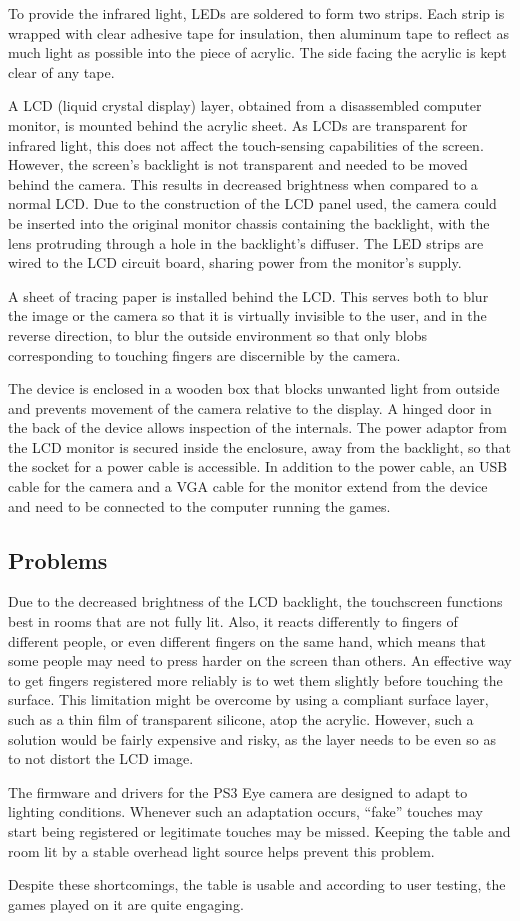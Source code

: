 \documentclass[a4paper,11pt]{article}
\begin{document}
To provide the infrared light, LEDs are soldered to form two strips.
Each strip is wrapped with clear adhesive tape for insulation, then aluminum
tape to reflect as much light as possible into the piece of acrylic.
The side facing the acrylic is kept clear of any tape.

A LCD (liquid crystal display) layer, obtained from a disassembled computer
monitor, is mounted behind the acrylic sheet.
As LCDs are transparent for infrared light, this does not affect the
touch-sensing capabilities of the screen.
However, the screen's backlight is not transparent and needed to be moved
behind the camera.
This results in decreased brightness when compared to a normal LCD.
Due to the construction of the LCD panel used, the camera could be inserted
into the original monitor chassis containing the backlight, with the lens
protruding through a hole in the backlight's diffuser.
The LED strips are wired to the LCD circuit board, sharing power from the
monitor's supply.

A sheet of tracing paper is installed %
behind the LCD. This serves both to blur the image or the camera so that it is
virtually invisible to the user, and in the reverse direction, to blur the
outside environment so that only blobs corresponding to touching fingers
are discernible by the camera.

The device is enclosed in a wooden box that blocks unwanted light from outside
and prevents movement of the camera relative to the display.
A hinged door in the back of the device allows inspection of the internals.
The power adaptor from the LCD monitor is secured inside the enclosure, away
from the backlight, so that the socket for a power cable is accessible.
In addition to the power cable, an USB cable for the camera and a VGA cable
for the monitor extend from the device and need to be connected to the computer
running the games.

\subsection{Problems}

Due to the decreased brightness of the LCD backlight, the touchscreen functions
best in rooms that are not fully lit.
Also, it reacts differently to fingers of different people, or even different
fingers on the same hand, which means that some people may need to press harder
on the screen than others.
An effective way to get fingers registered more reliably is to wet them
slightly before touching the surface.
This limitation might be overcome by using a compliant surface layer, such as
a thin film of transparent silicone, atop the acrylic.
However, such a solution would be fairly expensive and risky, as the layer
needs to be even so as to not distort the LCD image.

The firmware and drivers for the PS3 Eye camera are designed to adapt to
lighting conditions.
Whenever such an adaptation occurs, “fake” tou\-ches may start being registered
or legitimate touches may be missed.
Keeping the table and room lit by a stable overhead light source helps prevent
this problem.

Despite these shortcomings, the table is usable and according to user testing,
the games played on it are quite engaging.
\end{document}
